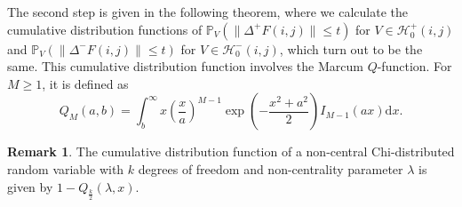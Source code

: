 \documentclass[a4paper,12pt]{article}
\newcommand{\norm}[1]{\lVert#1\rVert}
\theoremstyle{plain}
\theoremstyle{definition}
\newtheorem{remark}[theorem]{Remark}
\numberwithin{equation}{section}
\begin{document}
The second step is given in the following theorem, where we calculate the cumulative distribution functions of $\mathbb{P}_V( \norm{\Delta^+ F(i, j)} \leq t )$ for $V \in \mathcal{H}_0^+(i, j)$ and $\mathbb{P}_V( \norm{\Delta^- F(i, j)} \leq t )$ for $V \in \mathcal{H}_0^-(i, j)$, which turn out to be the same. This cumulative distribution function involves the Marcum $Q$-function. For $M \geq 1$, it is defined as \cite{IntQFunction}
\begin{equation*}
	Q_M(a, b) = \int_b^\infty x \left( \frac{x}{a} \right)^{M-1} \exp \left( -\frac{x^2 + a^2}{2} \right) I_{M-1}(a x) \mathrm{d}x.
\end{equation*}

\begin{samepage}
	\begin{remark}
		The cumulative distribution function of a non-central Chi-distributed random variable with $k$ degrees of freedom and non-centrality parameter $\lambda$ is given by $1 - Q_\frac{k}{2}(\lambda, x)$.
	\end{remark}
\end{samepage}
\end{document}
